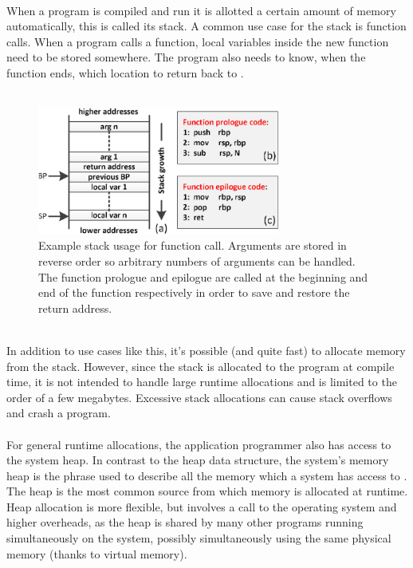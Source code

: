 \documentclass{article}
\begin{document}
\pagebreak
\\
When a program is compiled and run it is allotted a certain amount of memory automatically, this is called its stack. A common use case for the stack is function calls. When a program calls a function, local variables inside the new function need to be stored somewhere. The program also needs to know, when the function ends, which location to return back to \cite{10.5555/202036}.\\
\\
\begin{figure}[htbp]
	\centering
	\includegraphics[width=8cm]{stack_frame}
	\captionsetup{width=10cm}
	\caption{Example stack usage for function call. Arguments are stored in reverse order so arbitrary numbers of arguments can be handled. The function prologue and epilogue are called at the beginning and end of the function respectively in order to save and restore the return address. \cite{stackFrame}}
\end{figure}
\\
In addition to use cases like this,  it's possible (and quite fast) to allocate memory from the stack. However, since the stack is allocated to  the program at compile time, it is not intended to handle large runtime allocations and is limited to the order of a few megabytes. Excessive stack allocations can cause stack overflows and crash a program.\\
\\
For general runtime allocations, the application programmer also has access to the system heap. In contrast to the heap data structure, the system's memory heap is the phrase used to describe all the memory which a system has access to \cite{knuth97}. The heap is the most common source from which memory is allocated at runtime. Heap allocation is more flexible, but involves a call to the operating system and higher overheads, as the heap is shared by many other programs running simultaneously on the system, possibly simultaneously using the same physical memory (thanks to virtual memory).\\
\\
\end{document}
